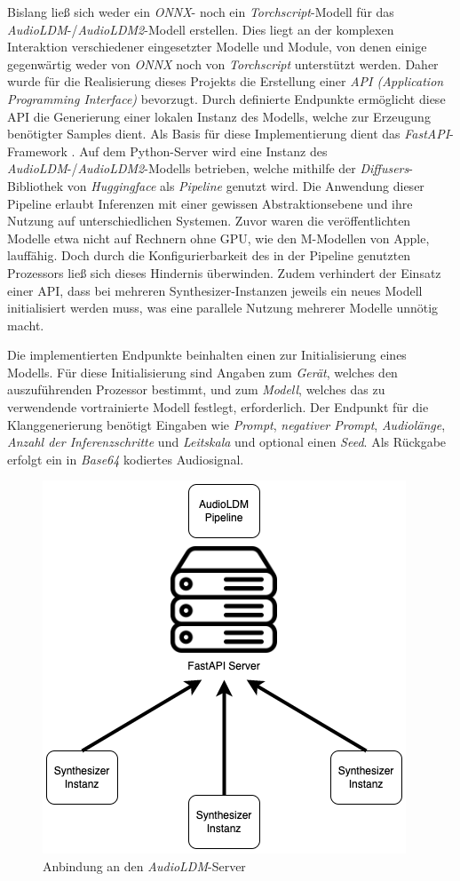 \documentclass[
  a4paper,  %
  twoside,  %
  bibliography=totoc,
  headsepline,
  cleardoublepage=empty,
  parskip=half,
  draft=false
]{scrbook}
\begin{document}
Bislang ließ sich weder ein \emph{ONNX}- noch ein \emph{Torchscript}-Modell für das \emph{AudioLDM}-/\emph{AudioLDM2}-Modell erstellen. Dies liegt an der komplexen Interaktion verschiedener eingesetzter Modelle und Module, von denen einige gegenwärtig weder von \emph{ONNX} noch von \emph{Torchscript} unterstützt werden. Daher wurde für die Realisierung dieses Projekts die Erstellung einer \emph{API (Application Programming Interface)} bevorzugt. Durch definierte Endpunkte ermöglicht diese API die Generierung einer lokalen Instanz des Modells, welche zur Erzeugung benötigter Samples dient. Als Basis für diese Implementierung dient das \emph{FastAPI}-Framework \cite{noauthor_fastapi_nodate}. Auf dem Python-Server wird eine Instanz des \emph{AudioLDM}-/\emph{AudioLDM2}-Modells betrieben, welche mithilfe der \emph{Diffusers}-Bibliothek von \emph{Huggingface} \cite{noauthor_huggingface_nodate-1, noauthor_huggingface_nodate} als \emph{Pipeline} genutzt wird. Die Anwendung dieser Pipeline erlaubt Inferenzen mit einer gewissen Abstraktionsebene und ihre Nutzung auf unterschiedlichen Systemen. Zuvor waren die veröffentlichten Modelle etwa nicht auf Rechnern ohne GPU, wie den M-Modellen von Apple, lauffähig. Doch durch die Konfigurierbarkeit des in der Pipeline genutzten Prozessors ließ sich dieses Hindernis überwinden. Zudem verhindert der Einsatz einer API, dass bei mehreren Synthesizer-Instanzen jeweils ein neues Modell initialisiert werden muss, was eine parallele Nutzung mehrerer Modelle unnötig macht.

Die implementierten Endpunkte beinhalten einen zur Initialisierung eines Modells. Für diese Initialisierung sind Angaben zum \emph{Gerät}, welches den auszuführenden Prozessor bestimmt, und zum \emph{Modell}, welches das zu verwendende vortrainierte Modell festlegt, erforderlich. Der Endpunkt für die Klanggenerierung benötigt Eingaben wie \emph{Prompt}, \emph{negativer Prompt}, \emph{Audiolänge}, \emph{Anzahl der Inferenzschritte} und \emph{Leitskala} und optional einen \emph{Seed}. Als Rückgabe erfolgt ein in \emph{Base64} kodiertes Audiosignal.

\begin{figure}
  \centering
  \includegraphics[width=.4\textwidth]{graphics/Server.png}
  \caption[AudiLDM Anbindung]{Anbindung an den \emph{AudioLDM}-Server}
  \label{fig:server}
\end{figure}
\end{document}
